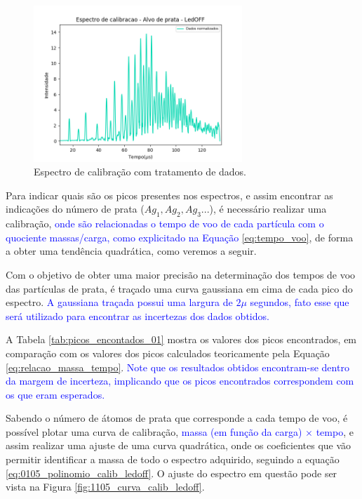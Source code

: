 \begin{figure}
  \centering  
  \includegraphics[width=0.7\textwidth]{exp_01/LedOFF_normalizado_mcp.png}
  \caption{Espectro de calibração com tratamento de dados.}
  \label{fig:0105_ledoff_dados_tratados} 
\end{figure}

Para indicar quais são os picos presentes nos espectros, e assim encontrar as indicações do número de prata ($Ag_{1},Ag_{2},Ag_{3}...$), é necessário realizar uma calibração, \textcolor{blue}{onde são relacionadas o tempo de voo de cada partícula com o quociente massas/carga, como explicitado na Equação \ref{eq:tempo_voo}}, de forma a obter uma tendência quadrática, como veremos a seguir.

Com o objetivo de obter uma maior precisão na determinação dos tempos de voo das partículas de prata, é traçado uma curva gaussiana em cima de cada pico do espectro. \textcolor{blue}{A gaussiana traçada possui uma largura de $2\mu$ segundos, fato esse que será utilizado para encontrar as incertezas dos dados obtidos.}

A Tabela \ref{tab:picos_encontados_01} mostra os valores dos picos encontrados, em comparação com os valores dos picos calculados teoricamente pela Equação \ref{eq:relacao_massa_tempo}. \textcolor{blue}{ Note que os resultados obtidos encontram-se dentro da margem de incerteza, implicando que os picos encontrados correspondem com os que eram esperados.} 



Sabendo o número de átomos de prata que corresponde a cada tempo de voo, é possível plotar uma curva de calibração, \textcolor{blue}{massa (em função da carga) $\times$ tempo}, e assim realizar uma ajuste de uma curva quadrática, onde os coeficientes que vão permitir identificar a massa de todo o espectro adquirido, seguindo a equação \ref{eq:0105_polinomio_calib_ledoff}. O ajuste do espectro em questão pode ser vista na Figura \ref{fig:1105_curva_calib_ledoff}.

